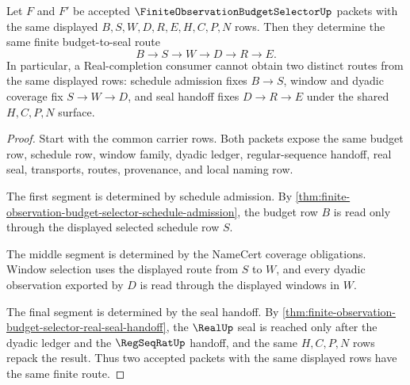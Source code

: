 \begin{theorem}
\label{thm:finite-observation-budget-selector-budget-route-determinacy}
Let $F$ and $F'$ be accepted $\FiniteObservationBudgetSelectorUp$ packets with the same displayed $B,S,W,D,R,E,H,C,P,N$ rows. Then they determine the same finite budget-to-seal route
$$
B \to S \to W \to D \to R \to E.
$$
In particular, a Real-completion consumer cannot obtain two distinct routes from the same displayed rows: schedule admission fixes $B \to S$, window and dyadic coverage fix $S \to W \to D$, and seal handoff fixes $D \to R \to E$ under the shared $H,C,P,N$ surface.
\end{theorem}
\begin{proof}
Start with the common carrier rows. Both packets expose the same budget row, schedule row, window family, dyadic ledger, regular-sequence handoff, real seal, transports, routes, provenance, and local naming row.

The first segment is determined by schedule admission. By \autoref{thm:finite-observation-budget-selector-schedule-admission}, the budget row $B$ is read only through the displayed selected schedule row $S$.

The middle segment is determined by the NameCert coverage obligations. Window selection uses the displayed route from $S$ to $W$, and every dyadic observation exported by $D$ is read through the displayed windows in $W$.

The final segment is determined by the seal handoff. By \autoref{thm:finite-observation-budget-selector-real-seal-handoff}, the $\RealUp$ seal is reached only after the dyadic ledger and the $\RegSeqRatUp$ handoff, and the same $H,C,P,N$ rows repack the result. Thus two accepted packets with the same displayed rows have the same finite route.
\end{proof}

